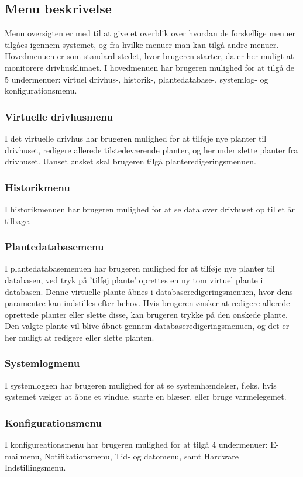 \subsection{Menu beskrivelse}
Menu oversigten er med til at give et overblik over hvordan de forskellige menuer tilgåes igennem systemet, og fra hvilke menuer man kan tilgå andre menuer. Hovedmenuen er som standard stedet, hvor brugeren starter, da er her muligt at monitorere drivhusklimaet. I hovedmenuen har brugeren mulighed for at tilgå de 5 undermenuer: virtuel drivhus-, historik-, plantedatabase-, systemlog- og konfigurationsmenu.
\subsubsection{Virtuelle drivhusmenu}
I det virtuelle drivhus har brugeren mulighed for at tilføje nye planter til drivhuset, redigere allerede tilstedeværende planter, og herunder slette planter fra drivhuset. Uanset ønsket skal brugeren tilgå planteredigeringsmenuen.
\subsubsection{Historikmenu}
I historikmenuen har brugeren mulighed for at se data over drivhuset op til et år tilbage.
\subsubsection{Plantedatabasemenu}
I plantedatabasemenuen har brugeren mulighed for at tilføje nye planter til databasen, ved tryk på 'tilføj plante' oprettes en ny tom virtuel plante i databasen. Denne virtuelle plante åbnes i databaseredigeringsmenuen, hvor dens paramentre kan indstilles efter behov. Hvis brugeren ønsker at redigere allerede oprettede planter eller slette disse, kan brugeren trykke på den ønskede plante. Den valgte plante vil blive åbnet gennem databaseredigeringsmenuen, og det er her muligt at redigere eller slette planten.
\subsubsection{Systemlogmenu}
I systemloggen har brugeren mulighed for at se systemhændelser, f.eks. hvis systemet vælger at åbne et vindue, starte en blæser, eller bruge varmelegemet.
\subsubsection{Konfigurationsmenu}
I konfigureationsmenu har brugeren mulighed for at tilgå 4 undermenuer: E-mailmenu, Notifikationsmenu, Tid- og datomenu, samt Hardware Indstillingsmenu.


